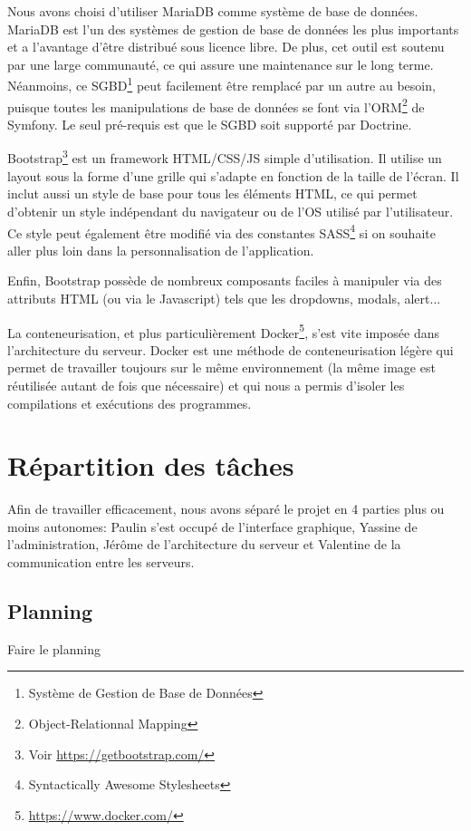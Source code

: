 \par Nous avons choisi d'utiliser MariaDB comme système de base de données. MariaDB est l'un des systèmes de gestion de base de données les plus importants et a l'avantage d'être distribué sous licence libre. De plus, cet outil est soutenu par une large communauté, ce qui assure une maintenance sur le long terme. Néanmoins, ce SGBD\footnote{Système de Gestion de Base de Données} peut facilement être remplacé par un autre au besoin, puisque toutes les manipulations de base de données se font via l'ORM\footnote{Object-Relationnal Mapping} de Symfony. Le seul pré-requis est que le SGBD soit supporté par Doctrine. \\

\par Bootstrap\footnote{Voir \url{https://getbootstrap.com/}} est un framework HTML/CSS/JS simple d'utilisation. Il utilise un layout sous la forme d'une grille qui s'adapte en fonction de la taille de l'écran. Il inclut aussi un style de base pour tous les éléments HTML, ce qui permet d'obtenir un style indépendant du navigateur ou de l'OS utilisé par l'utilisateur. Ce style peut également être modifié via des constantes SASS\footnote{Syntactically Awesome Stylesheets} si on souhaite aller plus loin dans la personnalisation de l'application.
\par Enfin, Bootstrap possède de nombreux composants faciles à manipuler via des attributs HTML (ou via le Javascript) tels que les dropdowns, modals, alert... \\

\par La conteneurisation, et plus particulièrement Docker\footnote{\url{https://www.docker.com/}}, s'est vite imposée dans l'architecture du serveur. Docker est une méthode de conteneurisation légère qui permet de travailler toujours sur le même environnement (la même image est réutilisée autant de fois que nécessaire) et qui nous a permis d'isoler les compilations et exécutions des programmes.

\section{Répartition des tâches}

\par Afin de travailler efficacement, nous avons séparé le projet en 4 parties plus ou moins autonomes: Paulin s'est occupé de l'interface graphique, Yassine de l'administration, Jérôme de l'architecture du serveur et Valentine de la communication entre les serveurs.

\subsection{Planning}

Faire le planning
